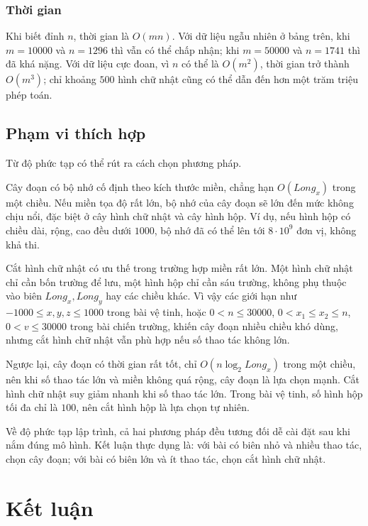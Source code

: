 \documentclass[11pt]{article}
\begin{document}
\subsubsection{Thời gian}

Khi biết đỉnh $n$, thời gian là $O(mn)$. Với dữ liệu ngẫu nhiên ở bảng trên,
khi $m=10000$ và $n=1296$ thì vẫn có thể chấp nhận; khi $m=50000$ và
$n=1741$ thì đã khá nặng. Với dữ liệu cực đoan, vì $n$ có thể là $O(m^2)$,
thời gian trở thành $O(m^3)$; chỉ khoảng $500$ hình chữ nhật cũng có thể dẫn
đến hơn một trăm triệu phép toán.

\subsection{Phạm vi thích hợp}

Từ độ phức tạp có thể rút ra cách chọn phương pháp.

Cây đoạn có bộ nhớ cố định theo kích thước miền, chẳng hạn
$O(\textit{Long}_x)$ trong một chiều. Nếu miền tọa độ rất lớn, bộ nhớ của cây
đoạn sẽ lớn đến mức không chịu nổi, đặc biệt ở cây hình chữ nhật và cây hình
hộp. Ví dụ, nếu hình hộp có chiều dài, rộng, cao đều dưới $1000$, bộ nhớ đã
có thể lên tới $8\cdot 10^9$ đơn vị, không khả thi.

Cắt hình chữ nhật có ưu thế trong trường hợp miền rất lớn. Một hình chữ nhật
chỉ cần bốn trường để lưu, một hình hộp chỉ cần sáu trường, không phụ thuộc
vào biên $\textit{Long}_x,\textit{Long}_y$ hay các chiều khác. Vì vậy các
giới hạn như $-1000\le x,y,z\le 1000$ trong bài vệ tinh, hoặc
$0<n\le 30000$, $0<x_1\le x_2\le n$, $0<v\le 30000$ trong bài chiến trường,
khiến cây đoạn nhiều chiều khó dùng, nhưng cắt hình chữ nhật vẫn phù hợp nếu
số thao tác không lớn.

Ngược lại, cây đoạn có thời gian rất tốt, chỉ
$O(n\log_2\textit{Long}_x)$ trong một chiều, nên khi số thao tác lớn và miền
không quá rộng, cây đoạn là lựa chọn mạnh. Cắt hình chữ nhật suy giảm nhanh
khi số thao tác lớn. Trong bài vệ tinh, số hình hộp tối đa chỉ là $100$, nên
cắt hình hộp là lựa chọn tự nhiên.

Về độ phức tạp lập trình, cả hai phương pháp đều tương đối dễ cài đặt sau khi
nắm đúng mô hình. Kết luận thực dụng là: với bài có biên nhỏ và nhiều thao
tác, chọn cây đoạn; với bài có biên lớn và ít thao tác, chọn cắt hình chữ
nhật.

\section{Kết luận}
\end{document}
